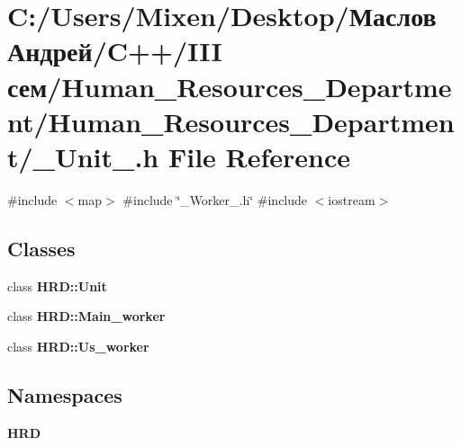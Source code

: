\section{C\+:/\+Users/\+Mixen/\+Desktop/Маслов Андрей/\+C++/\+I\+II сем/\+Human\+\_\+\+Resources\+\_\+\+Department/\+Human\+\_\+\+Resources\+\_\+\+Department/\+\_\+\+Unit\+\_\+.h File Reference}
\label{___unit___8h}
{\ttfamily \#include $<$map$>$}\newline
{\ttfamily \#include \char`\"{}\+\_\+\+Worker\+\_\+.\+h\char`\"{}}\newline
{\ttfamily \#include $<$iostream$>$}\newline
\subsection*{Classes}
\begin{DoxyCompactItemize}
\item 
class \textbf{ H\+R\+D\+::\+Unit}
\item 
class \textbf{ H\+R\+D\+::\+Main\+\_\+worker}
\item 
class \textbf{ H\+R\+D\+::\+Us\+\_\+worker}
\end{DoxyCompactItemize}
\subsection*{Namespaces}
\begin{DoxyCompactItemize}
\item 
 \textbf{ H\+RD}
\end{DoxyCompactItemize}

